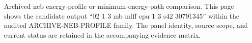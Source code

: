 Archived neb energy-profile or minimum-energy-path comparison. This page shows the candidate output ``02 1 3 mb mlff cpu 1 3 s42 30791345'' within the audited ARCHIVE-NEB-PROFILE family. The panel identity, source scope, and current status are retained in the accompanying evidence matrix.
